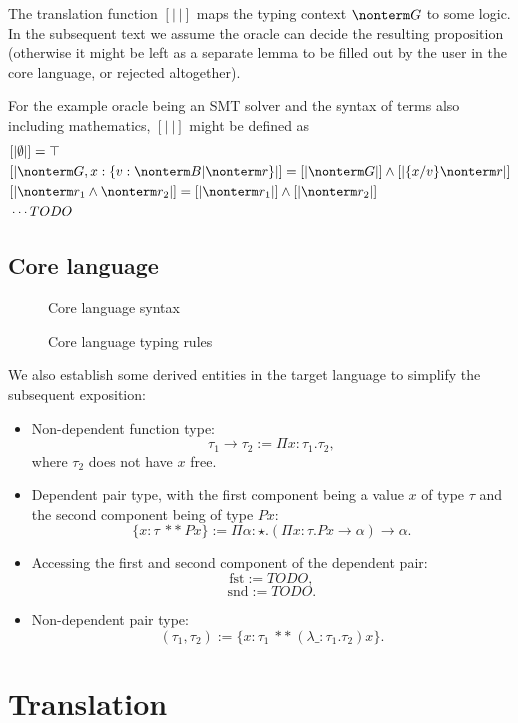 \documentclass[a4paper]{article}
\begin{document}
The translation function $[|\ |]$ maps the typing context $\nonterm G$ to some logic.
In the subsequent text we assume the oracle can decide the resulting proposition
(otherwise it might be left as a separate lemma to be filled out by the user in the core language, or rejected altogether).

For the example oracle being an SMT solver and the syntax of terms also including mathematics, $[|\ |]$ might be defined as
\begin{equation}
\begin{aligned}
  & [| \emptyset |] = \top																						\\
  & [| \nonterm G, x : \{ v : \nonterm B | \nonterm r \} |] = [| \nonterm G |] \land [| \{x/v\} \nonterm r |]   \\
  & [| \nonterm r_1 \land \nonterm r_2 |] = [| \nonterm r_1 |] \land [| \nonterm r_2 |]							\\
  & \cdots TODO
\end{aligned}
\end{equation}

\subsection{Core language}

\begin{figure}[ht]
  \footnotesize
  \caption{Core language syntax}
  \label{fig:core_syntax}
\end{figure}

\begin{figure}[ht]
  \footnotesize
  \caption{Core language typing rules}
  \label{fig:surface_typing}
\end{figure}

We also establish some derived entities in the target language to simplify the subsequent exposition:

\begin{itemize}
  \item Non-dependent function type:
	\[
	  \tau_1 \rightarrow \tau_2 := \Pi x : \tau_1. \tau_2,
	\]
	where $\tau_2$ does not have $x$ free.
  \item Dependent pair type, with the first component being a value $x$ of type $\tau$ and the second component being of type $P x$:
	\[
	  \{ x : \tau\ **\ P x \} := \Pi \alpha : \star. (\Pi x : \tau. P x \rightarrow \alpha) \rightarrow \alpha.
	\]
  \item Accessing the first and second component of the dependent pair:
	\[
	  \text{fst} := TODO,
	\]
	\[
	  \text{snd} := TODO.
	\]
  \item Non-dependent pair type:
	\[
	  (\tau_1, \tau_2) := \{ x : \tau_1\ **\ (\lambda \_ : \tau_1. \tau_2) x \}.
	\]
\end{itemize}

\section{Translation}
\end{document}
